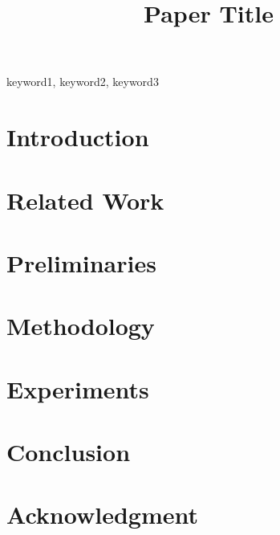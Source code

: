 \documentclass[conference]{IEEEtran}
\begin{document}
\title{Paper Title}

\author{
}

\maketitle

\begin{abstract}
\end{abstract}

\begin{IEEEkeywords}
keyword1, keyword2, keyword3
\end{IEEEkeywords}

\section{Introduction}

\section{Related Work}

\section{Preliminaries}

\section{Methodology}

\section{Experiments}

\section{Conclusion}

\section*{Acknowledgment}



\end{document}
